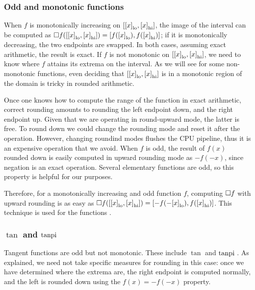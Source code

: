 \subsubsection{Odd and monotonic functions}
When $f$ is monotonically increasing on $[{[x]}_{\operatorname{lo}}, {[x]}_{\operatorname{hi}}]$, the image of the interval can be computed as $\Box f([{[x]}_{\operatorname{lo}}, {[x]}_{\operatorname{hi}}]) = [f({[x]}_{\operatorname{lo}}), f({[x]}_{\operatorname{hi}})]$; if it is monotonically decreasing, the two endpoints are swapped. In both cases, assuming exact arithmetic, the result is exact.
If $f$ is not monotonic on $[{[x]}_{\operatorname{lo}}, {[x]}_{\operatorname{hi}}]$, we need to know where $f$ attains its extrema on the interval. As we will see for some non-monotonic functions, even deciding that $[{[x]}_{\operatorname{lo}}, {[x]}_{\operatorname{hi}}]$ is in a monotonic region of the domain is tricky in rounded arithmetic.

Once one knows how to compute the range of the function in exact arithmetic, correct rounding amounts to rounding the left endpoint down, and the right endpoint up. Given that we are operating in round-upward mode, the latter is free. To round down we could change the rounding mode and reset it after the operation.
However, changing roundind modes flushes the CPU pipeline, thus it is an expensive operation that we avoid.
When $f$ is odd, the result of $f(x)$ rounded down is easily computed in upward rounding mode as $-f(-x)$, since negation is an exact operation. Several elementary functions are odd, so this property is helpful for our purposes.

Therefore, for a monotonically increasing and odd function $f$, computing $\Box f$ with upward rounding is as easy as $\Box f([{[x]}_{\operatorname{lo}}, {[x]}_{\operatorname{hi}}]) = [-f(-{[x]}_{\operatorname{lo}}), f({[x]}_{\operatorname{hi}})]$. This technique is used for the functions .

\subsubsection{$\tan$ and $\operatorname{tanpi}$}
Tangent functions are odd but not monotonic. These include $\tan$ and $\operatorname{tanpi}$ . As explained, we need not take specific measures for rounding in this case: once we have determined where the extrema are, the right endpoint is computed normally, and the left is rounded down using the $f(x) = -f(-x)$ property.

